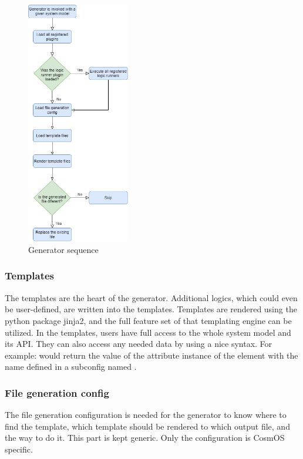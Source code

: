 \begin{figure}[H]
\begin{center}
\includegraphics[width=0.4\textwidth]{images/generator_flow}
\caption{Generator sequence}
\label{fig:generator_flow}
\end{center}
\end{figure}

\subsubsection{Templates}
The templates are the heart of the generator. Additional logics, which could even be user-defined, are written into the templates. Templates are rendered using the python package jinja2, and the full feature set of that templating engine can be utilized. In the templates, users have full access to the whole system model and its \ac{API}. They can also access any needed data by using a nice syntax. For example:  would return the value of the  attribute instance of the element with the name  defined in a subconfig named .

\subsubsection{File generation config}
The file generation configuration is needed for the generator to know where to find the template, which template should be rendered to which output file, and the way to do it. This part is kept generic. Only the configuration is CosmOS specific.


